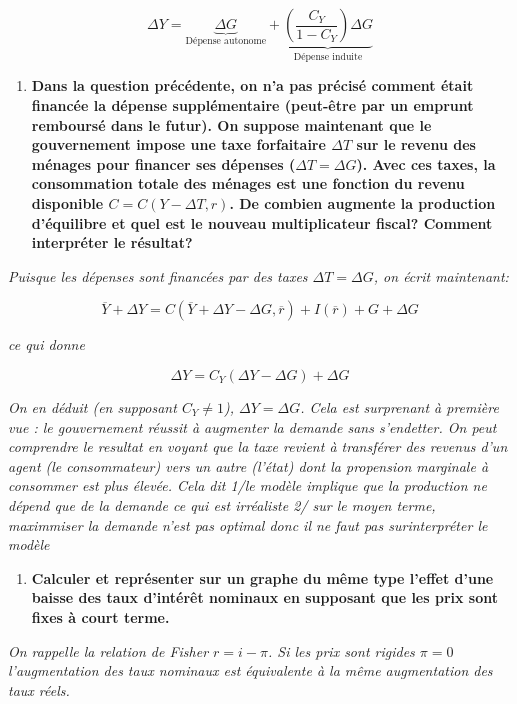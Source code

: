 \documentclass[
]{article}
\providecommand{\tightlist}{%
  \setlength{\itemsep}{0pt}\setlength{\parskip}{0pt}}
\begin{document}
\[\boxed{\Delta Y= \underbrace{\Delta G}_{\text{Dépense autonome}} + \underbrace{\left(\frac{C_Y}{1-C_Y}\right)\Delta G}_{\text{Dépense induite}}}\]

\begin{enumerate}
\def\labelenumi{\arabic{enumi}.}
\tightlist
\item
  \textbf{Dans la question précédente, on n'a pas précisé comment était
  financée la dépense supplémentaire (peut-être par un emprunt remboursé
  dans le futur). On suppose maintenant que le gouvernement impose une
  taxe forfaitaire \(\Delta T\) sur le revenu des ménages pour financer
  ses dépenses (\(\Delta T=\Delta G\)). Avec ces taxes, la consommation
  totale des ménages est une fonction du revenu disponible
  \(C=C(Y-\Delta T, r)\). De combien augmente la production d'équilibre
  et quel est le nouveau multiplicateur fiscal? Comment interpréter le
  résultat?}
\end{enumerate}

\emph{Puisque les dépenses sont financées par des taxes
\(\Delta T=\Delta G\), on écrit maintenant:}

\[\overline{Y} + \Delta Y= C(\overline{Y} + \Delta Y -\Delta G, \overline{r}) + I(\overline{r})  + G + \Delta G\]

\emph{ce qui donne}

\[\Delta Y = C_Y (\Delta Y - \Delta G) + \Delta G\]

\emph{On en déduit (en supposant \(C_Y \neq 1\)), \(\Delta Y=\Delta G\).
Cela est surprenant à première vue : le gouvernement réussit à augmenter
la demande sans s'endetter. On peut comprendre le resultat en voyant que
la taxe revient à transférer des revenus d'un agent (le consommateur)
vers un autre (l'état) dont la propension marginale à consommer est plus
élevée. Cela dit 1/le modèle implique que la production ne dépend que de
la demande ce qui est irréaliste 2/ sur le moyen terme, maximmiser la
demande n'est pas optimal donc il ne faut pas surinterpréter le modèle}

\begin{enumerate}
\def\labelenumi{\arabic{enumi}.}
\setcounter{enumi}{3}
\tightlist
\item
  \textbf{Calculer et représenter sur un graphe du même type l'effet
  d'une baisse des taux d'intérêt nominaux en supposant que les prix
  sont fixes à court terme.}
\end{enumerate}

\emph{On rappelle la relation de Fisher \(r=i-\pi\). Si les prix sont
rigides \(\pi=0\) l'augmentation des taux nominaux est équivalente à la
même augmentation des taux réels.}
\end{document}

